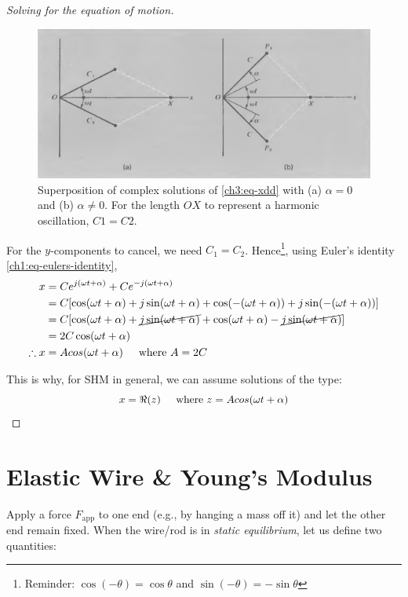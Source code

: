 \begin{proof}[Solving for the equation of motion]
\begin{figure}[h]
	\centering
	\includegraphics[scale=0.7]{phys232/Ch3-adding-complex-solutions.png} \caption{Superposition of complex solutions of \eqref{ch3:eq-xdd} with (a) $\alpha=0$ and (b) $\alpha\neq 0$. For the length $OX$ to represent a harmonic oscillation, $C1=C2$.}\label{ch3:fig-complex-sols}
\end{figure}


For the $y$-components to cancel, we need $C_1=C_2$. Hence\footnote{Reminder: $\cos(-\theta)=\cos\theta$ and $\sin(-\theta)=-\sin\theta$}, using Euler's identity \eqref{ch1:eq-eulers-identity},
\begin{align*}
x
&=Ce^{j(\omega t +\alpha)} + Ce^{-j(\omega t +\alpha)} \\
&=C[\cos(\omega t + \alpha) + j\sin(\omega t + \alpha) + \cos(-(\omega t + \alpha)) + j\sin(-(\omega t + \alpha))] \\
&=C[\cos(\omega t + \alpha) + \cancel{j\sin(\omega t + \alpha)} + \cos(\omega t + \alpha) - \cancel{j\sin(\omega t + \alpha)}] \\
&= 2C\cos(\omega t + \alpha) \\
\therefore
x &= Acos(\omega t + \alpha) \hspace{0.5cm}\text{where } A=2C
\end{align*}

This is why, for SHM in general, we can assume solutions of the type:
\begin{equation}
	x=\Re(z) \hspace{0.5cm}\text{where } z=Acos(\omega t + \alpha)
\end{equation}
\end{proof}


\section{Elastic Wire \& Young's Modulus} \label{ch3:sec-wire}

Apply a force $F_\text{app}$ to one end (e.g., by hanging a mass off it) and let the other end remain fixed. When the wire/rod is in \textit{static equilibrium}, let us define two quantities:

